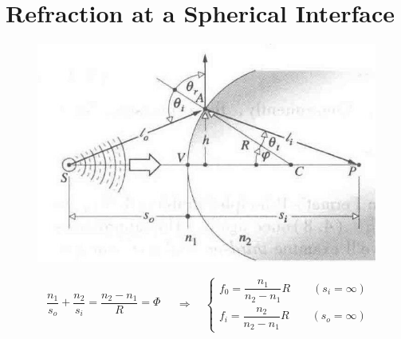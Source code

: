 \begin{figure}[H]
\begin{subfigure}{.65\textwidth}
  \end{subfigure}
\end{figure}

\section{Refraction at a Spherical Interface}

\begin{figure}[H]
  \centering
  \includegraphics[width=0.5\linewidth]{figures/Refraction-at-a-Spherical-Interface}
\end{figure}

\begin{equation*}
  \begin{aligned}
    \dfrac{n_1}{s_o} + \dfrac{n_2}{s_i} = \dfrac{n_2 - n_1}{R} = \Phi 
  \end{aligned}
  \quad \Rightarrow \quad
  \left\{
  \begin{aligned}
    f_0 = \dfrac{n_1}{n_2 - n_1} R \quad\quad (s_i = \infty) \\
    f_i = \dfrac{n_2}{n_2 - n_1} R \quad\quad (s_o = \infty)  
  \end{aligned}
  \right.
\end{equation*}

